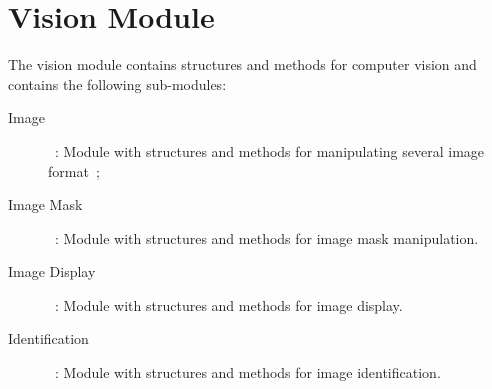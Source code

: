 \chapter{Vision Module}
\label{cha:vision}

The vision module contains structures and methods for computer vision and contains the following sub-modules:

\begin{description}
\item[Image]~: Module with structures and methods for manipulating several image format~;
\item[Image Mask]~: Module with structures and methods for image mask manipulation.
\item[Image Display]~: Module with structures and methods for image display.
\item[Identification]~: Module with structures and methods for image identification.

\end{description}

%






